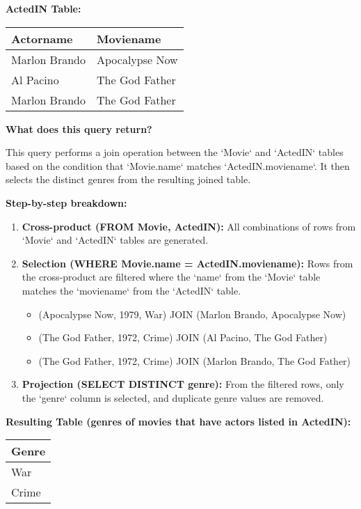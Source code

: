 \documentclass{article}
\begin{document}
\textbf{ActedIN Table:}
\begin{tabular}{|l|l|}
    \hline
    \textbf{Actorname} & \textbf{Moviename} \\
    \hline
    Marlon Brando & Apocalypse Now \\
    Al Pacino & The God Father \\
    Marlon Brando & The God Father \\
    \hline
\end{tabular}


\textbf{What does this query return?} 

This query performs a join operation between the `Movie` and `ActedIN` tables based on the condition that `Movie.name` matches `ActedIN.moviename`. It then selects the distinct genres from the resulting joined table.

\textbf{Step-by-step breakdown:}
\begin{enumerate}
    \item \textbf{Cross-product (FROM Movie, ActedIN):} All combinations of rows from `Movie` and `ActedIN` tables are generated.
    \item \textbf{Selection (WHERE Movie.name = ActedIN.moviename):} Rows from the cross-product are filtered where the `name` from the `Movie` table matches the `moviename` from the `ActedIN` table.
        \begin{itemize}
            \item (Apocalypse Now, 1979, War) JOIN (Marlon Brando, Apocalypse Now)
            \item (The God Father, 1972, Crime) JOIN (Al Pacino, The God Father)
            \item (The God Father, 1972, Crime) JOIN (Marlon Brando, The God Father)
        \end{itemize}
    \item \textbf{Projection (SELECT DISTINCT genre):} From the filtered rows, only the `genre` column is selected, and duplicate genre values are removed.
\end{enumerate}

\textbf{Resulting Table (genres of movies that have actors listed in ActedIN):}
\begin{tabular}{|l|}
    \hline
    \textbf{Genre} \\
    \hline
    War \\
    Crime \\
    \hline
\end{tabular}
\end{document}
